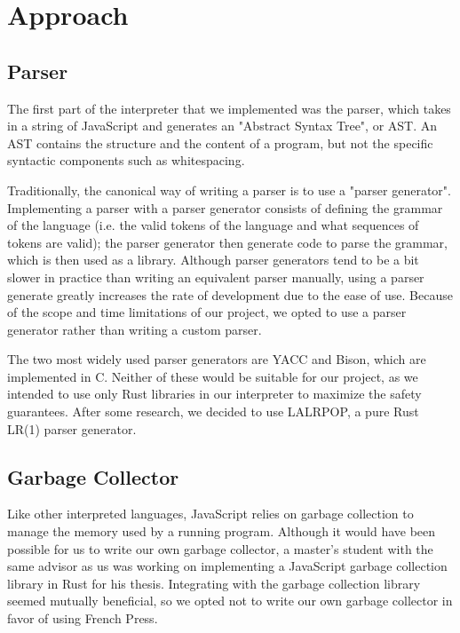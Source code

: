 \documentclass{article}
\begin{document}
\section*{Approach}

\subsection*{Parser}

The first part of the interpreter that we implemented was the parser, which
takes in a string of JavaScript and generates an "Abstract Syntax Tree", or AST.
An AST contains the structure and the content of a program, but not the specific
syntactic components such as whitespacing. \newline

Traditionally, the canonical way of writing a parser is to use a "parser
generator". Implementing a parser with a parser generator consists of defining
the grammar of the language (i.e. the valid tokens of the language and what
sequences of tokens are valid); the parser generator then generate code to parse
the grammar, which is then used as a library. Although parser generators tend to
be a bit slower in practice than writing an equivalent parser manually, using
a parser generate greatly increases the rate of development due to the ease of
use. Because of the scope and time limitations of our project, we opted to use a
parser generator rather than writing a custom parser. \newline

The two most widely used parser generators are YACC and Bison, which are
implemented in C. Neither of these would be suitable for our project, as we
intended to use only Rust libraries in our interpreter to maximize the safety
guarantees. After some research, we decided to use LALRPOP, a pure Rust LR(1)
parser generator\cite{lalrpop}.

\subsection*{Garbage Collector}

Like other interpreted languages, JavaScript relies on garbage collection to
manage the memory used by a running program. Although it would have been
possible for us to write our own garbage collector, a master's student
with the same advisor as us was working on implementing a JavaScript garbage
collection library in Rust for his thesis. Integrating with the garbage
collection library seemed mutually beneficial, so we opted not to write our own
garbage collector in favor of using French Press.
\end{document}

